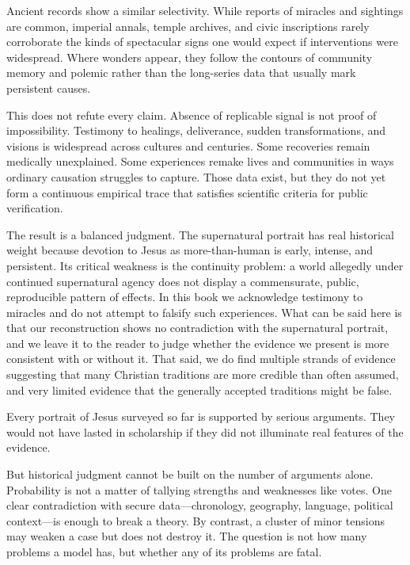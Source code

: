 Ancient records show a similar selectivity.
While reports of miracles and sightings are common, imperial annals, temple archives, and civic inscriptions rarely corroborate the kinds of spectacular signs one would expect if interventions were widespread.
Where wonders appear, they follow the contours of community memory and polemic rather than the long-series data that usually mark persistent causes.

This does not refute every claim.
Absence of replicable signal is not proof of impossibility.
Testimony to healings, deliverance, sudden transformations, and visions is widespread across cultures and centuries.
Some recoveries remain medically unexplained.
Some experiences remake lives and communities in ways ordinary causation struggles to capture.
Those data exist, but they do not yet form a continuous empirical trace that satisfies scientific criteria for public verification.

The result is a balanced judgment.
The supernatural portrait has real historical weight because devotion to Jesus as more-than-human is early, intense, and persistent.
Its critical weakness is the continuity problem: a world allegedly under continued supernatural agency does not display a commensurate, public, reproducible pattern of effects.
In this book we acknowledge testimony to miracles and do not attempt to falsify such experiences.
What can be said here is that our reconstruction shows no contradiction with the supernatural portrait, and we leave it to the reader to judge whether the evidence we present is more consistent with or without it.
That said, we do find multiple strands of evidence suggesting that many Christian traditions are more credible than often assumed, and very limited evidence that the generally accepted traditions might be false.

\medskip

Every portrait of Jesus surveyed so far is supported by serious arguments.
They would not have lasted in scholarship if they did not illuminate real features of the evidence.

But historical judgment cannot be built on the number of arguments alone.
Probability is not a matter of tallying strengths and weaknesses like votes.
One clear contradiction with secure data---chronology, geography, language, political context---is enough to break a theory.
By contrast, a cluster of minor tensions may weaken a case but does not destroy it.
The question is not how many problems a model has, but whether any of its problems are fatal.

